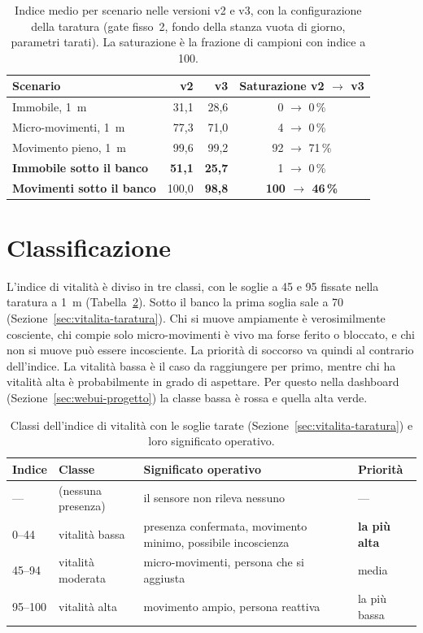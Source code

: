 \begin{table}[htbp]
\centering
\caption{Indice medio per scenario nelle versioni v2 e v3, con la configurazione della taratura (gate fisso~2, fondo della stanza vuota di giorno, parametri tarati). La saturazione è la frazione di campioni con indice a 100.}
\label{tab:vitalita-v2v3}
\small
\begin{tabular}{@{}lrrc@{}}
\toprule
Scenario & v2 & v3 & Saturazione v2 $\to$ v3 \\
\midrule
Immobile, 1~m & 31,1 & 28,6 & 0 $\to$ 0\,\% \\
Micro-movimenti, 1~m & 77,3 & 71,0 & 4 $\to$ 0\,\% \\
Movimento pieno, 1~m & 99,6 & 99,2 & 92 $\to$ 71\,\% \\
\textbf{Immobile sotto il banco} & \textbf{51,1} & \textbf{25,7} & 1 $\to$ 0\,\% \\
\textbf{Movimenti sotto il banco} & 100,0 & \textbf{98,8} & \textbf{100 $\to$ 46\,\%} \\
\bottomrule
\end{tabular}
\end{table}

\section{Classificazione}
\label{sec:vitalita-classi}

L'indice di vitalità è diviso in tre classi, con le soglie a 45 e 95 fissate nella taratura a 1~m (Tabella~\ref{tab:vitalita-classi}). Sotto il banco la prima soglia sale a 70 (Sezione~\ref{sec:vitalita-taratura}). Chi si muove ampiamente è verosimilmente cosciente, chi compie solo micro-movimenti è vivo ma forse ferito o bloccato, e chi non si muove può essere incosciente. La priorità di soccorso va quindi al contrario dell'indice. La vitalità bassa è il caso da raggiungere per primo, mentre chi ha vitalità alta è probabilmente in grado di aspettare. Per questo nella dashboard (Sezione~\ref{sec:webui-progetto}) la classe bassa è rossa e quella alta verde.

\begin{table}[htbp]
\centering
\caption{Classi dell'indice di vitalità con le soglie tarate
(Sezione~\ref{sec:vitalita-taratura}) e loro significato operativo. }
\label{tab:vitalita-classi}
\small
\begin{tabularx}{\linewidth}{@{}llXl@{}}
\toprule
\textbf{Indice} & \textbf{Classe} & \textbf{Significato operativo} & \textbf{Priorità} \\
\midrule
--- & (nessuna presenza) & il sensore non rileva nessuno & --- \\
0--44 & vitalità bassa & presenza confermata, movimento minimo, possibile
  incoscienza & \textbf{la più alta} \\
45--94 & vitalità moderata & micro-movimenti, persona che si aggiusta & media \\
95--100 & vitalità alta & movimento ampio, persona reattiva & la più bassa \\
\bottomrule
\end{tabularx}
\end{table}

